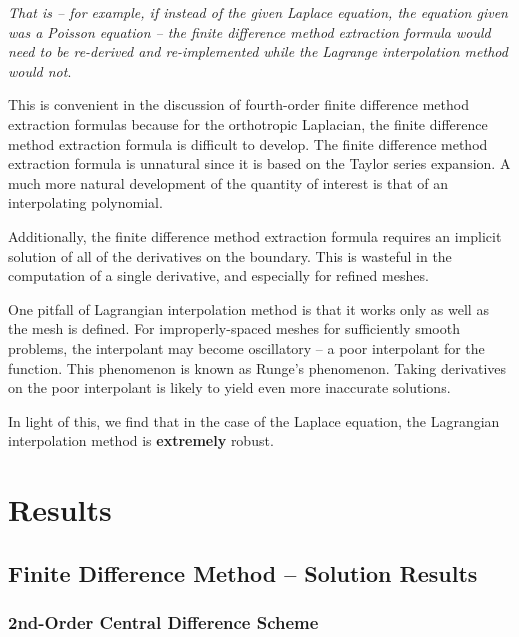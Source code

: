 \documentclass[10pt]{article}		%
\numberwithin{equation}{section}
\begin{document}
\textit{That is -- for example, if instead of the given Laplace equation, the equation given was a Poisson equation -- the finite difference method extraction formula would need to be re-derived and re-implemented while the Lagrange interpolation method would not}.

This is convenient in the discussion of fourth-order finite difference method extraction formulas because for the orthotropic Laplacian, the finite difference method extraction formula is difficult to develop. The finite difference method extraction formula is unnatural since it is based on the Taylor series expansion. A much more natural development of the quantity of interest is that of an interpolating polynomial.

Additionally, the finite difference method extraction formula requires an implicit solution of all of the derivatives on the boundary. This is wasteful in the computation of a single derivative, and especially for refined meshes.

One pitfall of Lagrangian interpolation method is that it works only as well as the mesh is defined. For improperly-spaced meshes for sufficiently smooth problems, the interpolant may become oscillatory -- a poor interpolant for the function. This phenomenon is known as Runge's phenomenon. Taking derivatives on the poor interpolant is likely to yield even more inaccurate solutions.

In light of this, we find that in the case of the Laplace equation, the Lagrangian interpolation method is \textbf{extremely} robust.

\newpage

\section{Results}

\subsection{Finite Difference Method -- Solution Results}

\subsubsection{2nd-Order Central Difference Scheme}
\end{document}
